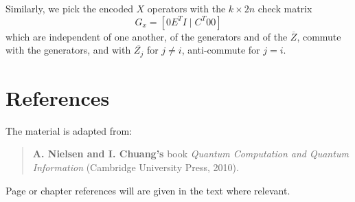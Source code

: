 \documentclass[11pt,a4paper]{article}
\theoremstyle{definition}
\theoremstyle{plain}
\theoremstyle{remark}
\begin{document}
Similarly, we pick the encoded $X$ operators with the $k \times 2n$ check matrix 
$$G_x = \left[0 E^T I \mid C^T 0 0\right]$$
which are independent of one another, of the generators and of the $\overline{Z}$, commute with the generators, and with $\overline{Z_j}$ for $j \neq i$, anti-commute for 
$j = i$. 

\section{References}
The material is adapted from: 
\begin{quote}
\textbf{A. Nielsen and I. Chuang's} book \emph{Quantum Computation and Quantum Information} (Cambridge University Press, 2010).
\end{quote}
Page or chapter references will are given in the text where relevant. 
\end{document}
